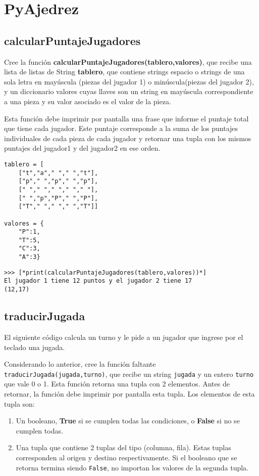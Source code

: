 \section{PyAjedrez}

\subsection{calcularPuntajeJugadores}
Cree la función \textbf{calcularPuntajeJugadores(tablero,valores)}, que recibe una lista de listas de String  \textbf{tablero}, que contiene strings espacio o strings de una sola letra en mayúscula (piezas del jugador 1) o minúscula(piezas del jugador 2), y un diccionario valores cuyas llaves son un string en mayúscula correspondiente a una pieza y su valor asociado es el valor de la pieza.

Esta función debe imprimir por pantalla una frase que informe el puntaje total que tiene cada jugador. Este puntaje corresponde a la suma de los puntajes individuales de cada pieza de cada jugador y retornar una tupla con los mismos puntajes del jugador1 y del jugador2 en ese orden.

\begin{lstlisting}[style=consola]
tablero = [
    ["t","a"," "," ","t"],
    ["p"," ","p"," ","p"],
    [" "," "," "," "," "],
    [" ","p","P"," ","P"],
    ["T"," "," "," ","T"]]

valores = {
    "P":1,
    "T":5,
    "C":3,
    "A":3}
\end{lstlisting}

\begin{lstlisting}[style=consola]
>>> [*print(calcularPuntajeJugadores(tablero,valores))*]
El jugador 1 tiene 12 puntos y el jugador 2 tiene 17
(12,17)
\end{lstlisting}





\subsection{traducirJugada}
El siguiente código calcula un turno y le pide a un jugador que ingrese por el teclado una jugada.



Considerando lo anterior, cree la función faltante \texttt{traducirJugada(jugada,turno)}, que recibe un string \texttt{jugada} y un entero \texttt{turno} que vale 0 o 1. Esta función retorna una tupla con 2 elementos. Antes de retornar, la función debe imprimir por pantalla esta tupla. Los elementos de esta tupla son:
\begin{enumerate}
    \item Un booleano, \textbf{True} si se cumplen todas las condiciones, o \textbf{False} si no se cumplen todas.
    \item Una tupla que contiene 2 tuplas del tipo (columna, fila). Estas tuplas corresponden al origen y destino respectivamente. Si el booleano que se retorna termina siendo \texttt{False}, no importan los valores de la segunda tupla.
\end{enumerate}

